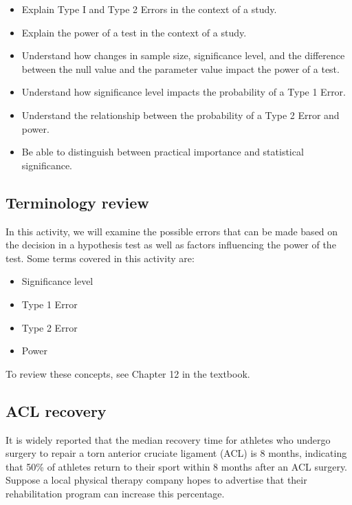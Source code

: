 \documentclass[
]{report}
\begin{document}
\begin{itemize}
\item
  Explain Type I and Type 2 Errors in the context of a study.
\item
  Explain the power of a test in the context of a study.
\item
  Understand how changes in sample size, significance level, and the difference between the null value and the parameter value impact the power of a test.
\item
  Understand how significance level impacts the probability of a Type 1 Error.
\item
  Understand the relationship between the probability of a Type 2 Error and power.
\item
  Be able to distinguish between practical importance and statistical significance.
\end{itemize}

\hypertarget{terminology-review-12}{%
\subsection{Terminology review}\label{terminology-review-12}}

In this activity, we will examine the possible errors that can be made based on the decision in a hypothesis test as well as factors influencing the power of the test. Some terms covered in this activity are:

\begin{itemize}
\item
  Significance level
\item
  Type 1 Error
\item
  Type 2 Error
\item
  Power
\end{itemize}

To review these concepts, see Chapter 12 in the textbook.

\hypertarget{acl-recovery}{%
\subsection{ACL recovery}\label{acl-recovery}}

It is widely reported that the median recovery time for athletes who undergo surgery to repair a torn anterior cruciate ligament (ACL) is 8 months, indicating that 50\% of athletes return to their sport within 8 months after an ACL surgery. Suppose a local physical therapy company hopes to advertise that their rehabilitation program can increase this percentage.
\end{document}
